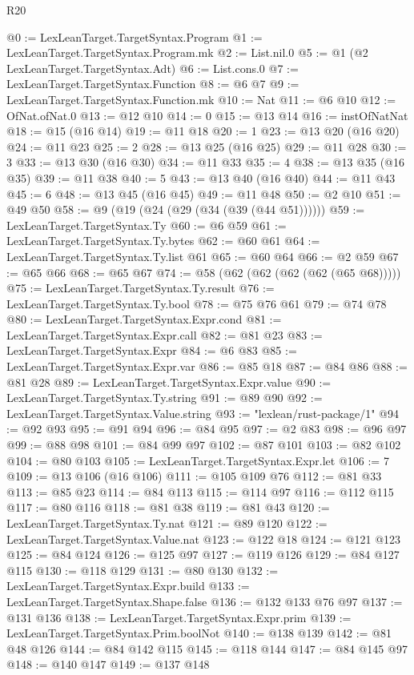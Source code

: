 \begin{lexlean}{R20}
\begin{coremodule}
@0 := LexLeanTarget.TargetSyntax.Program
@1 := LexLeanTarget.TargetSyntax.Program.mk
@2 := List.nil.{0}
@5 := @1 (@2 LexLeanTarget.TargetSyntax.Adt)
@6 := List.cons.{0}
@7 := LexLeanTarget.TargetSyntax.Function
@8 := @6 @7
@9 := LexLeanTarget.TargetSyntax.Function.mk
@10 := Nat
@11 := @6 @10
@12 := OfNat.ofNat.{0}
@13 := @12 @10
@14 := 0
@15 := @13 @14
@16 := instOfNatNat
@18 := @15 (@16 @14)
@19 := @11 @18
@20 := 1
@23 := @13 @20 (@16 @20)
@24 := @11 @23
@25 := 2
@28 := @13 @25 (@16 @25)
@29 := @11 @28
@30 := 3
@33 := @13 @30 (@16 @30)
@34 := @11 @33
@35 := 4
@38 := @13 @35 (@16 @35)
@39 := @11 @38
@40 := 5
@43 := @13 @40 (@16 @40)
@44 := @11 @43
@45 := 6
@48 := @13 @45 (@16 @45)
@49 := @11 @48
@50 := @2 @10
@51 := @49 @50
@58 := @9 (@19 (@24 (@29 (@34 (@39 (@44 @51))))))
@59 := LexLeanTarget.TargetSyntax.Ty
@60 := @6 @59
@61 := LexLeanTarget.TargetSyntax.Ty.bytes
@62 := @60 @61
@64 := LexLeanTarget.TargetSyntax.Ty.list @61
@65 := @60 @64
@66 := @2 @59
@67 := @65 @66
@68 := @65 @67
@74 := @58 (@62 (@62 (@62 (@62 (@65 @68)))))
@75 := LexLeanTarget.TargetSyntax.Ty.result
@76 := LexLeanTarget.TargetSyntax.Ty.bool
@78 := @75 @76 @61
@79 := @74 @78
@80 := LexLeanTarget.TargetSyntax.Expr.cond
@81 := LexLeanTarget.TargetSyntax.Expr.call
@82 := @81 @23
@83 := LexLeanTarget.TargetSyntax.Expr
@84 := @6 @83
@85 := LexLeanTarget.TargetSyntax.Expr.var
@86 := @85 @18
@87 := @84 @86
@88 := @81 @28
@89 := LexLeanTarget.TargetSyntax.Expr.value
@90 := LexLeanTarget.TargetSyntax.Ty.string
@91 := @89 @90
@92 := LexLeanTarget.TargetSyntax.Value.string
@93 := "lexlean/rust-package/1"
@94 := @92 @93
@95 := @91 @94
@96 := @84 @95
@97 := @2 @83
@98 := @96 @97
@99 := @88 @98
@101 := @84 @99 @97
@102 := @87 @101
@103 := @82 @102
@104 := @80 @103
@105 := LexLeanTarget.TargetSyntax.Expr.let
@106 := 7
@109 := @13 @106 (@16 @106)
@111 := @105 @109 @76
@112 := @81 @33
@113 := @85 @23
@114 := @84 @113
@115 := @114 @97
@116 := @112 @115
@117 := @80 @116
@118 := @81 @38
@119 := @81 @43
@120 := LexLeanTarget.TargetSyntax.Ty.nat
@121 := @89 @120
@122 := LexLeanTarget.TargetSyntax.Value.nat
@123 := @122 @18
@124 := @121 @123
@125 := @84 @124
@126 := @125 @97
@127 := @119 @126
@129 := @84 @127 @115
@130 := @118 @129
@131 := @80 @130
@132 := LexLeanTarget.TargetSyntax.Expr.build
@133 := LexLeanTarget.TargetSyntax.Shape.false
@136 := @132 @133 @76 @97
@137 := @131 @136
@138 := LexLeanTarget.TargetSyntax.Expr.prim
@139 := LexLeanTarget.TargetSyntax.Prim.boolNot
@140 := @138 @139
@142 := @81 @48 @126
@144 := @84 @142 @115
@145 := @118 @144
@147 := @84 @145 @97
@148 := @140 @147
@149 := @137 @148

\end{coremodule}
\end{lexlean}
